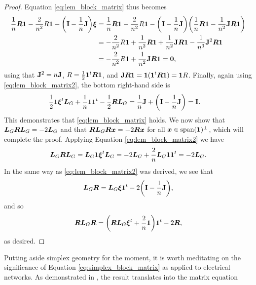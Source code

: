 \begin{proof}
Equation \eqref{eq:lem_block_matrix} thus becomes 
\begin{align*}
\frac{1}{n}\vb*{R}\vb{1} -\frac{2}{n^2}R \vb{1} - \bigg(\vb{I}-\frac{1}{n}\vb{J}\bigg)\vb*{\xi} &= \frac{1}{n}\vb*{R}\vb{1} - \frac{2}{n^2}R\vb{1} - \bigg(\vb{I}-\frac{1}{n}\vb{J}\bigg)\bigg(\frac{1}{n}\vb*{R}\vb{1} - \frac{1}{n^2}\vb{J}\vb*{R}\vb{1}\bigg) \\
&= -\frac{2}{n^2} R\vb{1} + \frac{1}{n^2}\vb*{R}\vb{1} + \frac{1}{n^2}\vb{J}\vb*{R}\vb{1} - \frac{1}{n^3}\vb{J}^2\vb*{R}\vb{1} \\
&= -\frac{2}{n^2} R\vb{1} +\frac{1}{n^2} \vb{J}\vb*{R}\vb{1} = \vb{0},
\end{align*}
using that $\vb{J}^2 = n \vb{J}$, $R=\frac{1}{2}\vb{1}^t \vb*{R}\vb{1}$, and $\vb{J}\vb*{R}\vb{1} = \vb{1}(\vb{1}^t \vb*{R}\vb{1}) = \vb{1} R$. Finally, again using \eqref{eq:lem_block_matrix2}, the bottom right-hand side is 
\begin{align*}
\frac{1}{2}\vb{1} \vb*{\xi}^t \vb*{L}_G + \frac{1}{n}\vb{1}\vb{1}^t - \frac{1}{2}\vb*{R}\vb*{L}_G &= \frac{1}{n}\vb{J} + \bigg(\vb{I}-\frac{1}{n}\vb{J}\bigg) = \vb{I}.
\end{align*}
This demonstrates that \eqref{eq:lem_block_matrix} holds. We now show that $\vb*{L}_G \vb*{R}\vb*{L}_G = -2 \vb*{L}_G$ and that $\vb*{R}\vb*{L}_G\vb*{R}\vb*{x} = -2\vb*{R}\vb*{x}$ for all $\vb*{x}\in\textnormal{span}(\vb{1})^\perp$, which will complete the proof. Applying Equation \eqref{eq:lem_block_matrix2} we have 
\begin{align*}
\vb*{L}_G\vb*{R}\vb*{L}_G = \vb*{L}_G\vb{1} \vb*{\xi}^t\vb*{L}_G = -2\vb*{L}_G+ \frac{2}{n}\vb*{L}_G\vb{1}\vb{1}^t = -2\vb*{L}_G.
\end{align*}
In the same way as \eqref{eq:lem_block_matrix2} was derived, we see that 
\begin{equation*}
\vb*{L}_G\vb*{R} = \vb*{L}_G\vb*{\xi}\vb{1}^t - 2\bigg(\vb{I}-\frac{1}{n}\vb{J}\bigg),
\end{equation*}
and so 
\begin{equation*}
\vb*{R}\vb*{L}_G\vb*{R}= \bigg(\vb*{R}\vb*{L}_G\vb*{\xi}^t + \frac{2}{n}\vb{1} \bigg)\vb{1}^t -2\vb*{R},
\end{equation*}
as desired. 
\end{proof}

Putting aside simplex geometry for the moment, it is worth meditating on the significance of Equation \eqref{eq:simplex_block_matrix} as applied to electrical networks. As demonstrated in \cite{van2017pseudoinverse}, the result translates into the matrix equation 

